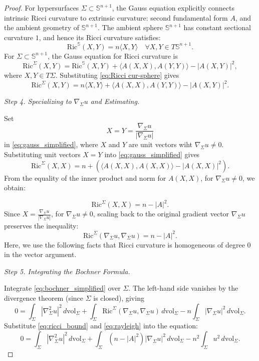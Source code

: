 \documentclass[10pt,a4paper]{amsart}
\begin{document}
\begin{proof}
For hypersurfaces \(\Sigma \subset \mathbb{S}^{n+1}\), the Gauss equation explicitly connects intrinsic Ricci curvature to extrinsic curvature: second fundamental form \(A\), and the ambient geometry of \(\mathbb{S}^{n+1}\). The ambient sphere \(\mathbb{S}^{n+1}\) has constant sectional curvature \(1\), and hence its Ricci curvature satisfies:
\begin{equation}\label{eq:Ricci cur-sphere}
\text{Ric}^{\mathbb{S}}(X,Y) = n \langle X,Y \rangle \quad \forall X,Y \in T\mathbb{S}^{n+1}.
\end{equation}
For \(\Sigma \subset \mathbb{S}^{n+1}\), the Gauss equation for Ricci curvature is
\begin{equation}\label{eq:gauss}
\text{Ric}^\Sigma(X,Y) = \text{Ric}^{\mathbb{S}}(X,Y) + \langle A(X,X), A(Y,Y) \rangle - |A(X,Y)|^2,
\end{equation}
where \(X,Y \in T\Sigma\). Substituting \eqref{eq:Ricci cur-sphere} gives
\begin{equation}\label{eq:gauss_simplified}
\text{Ric}^\Sigma(X,Y) = n \langle X,Y \rangle + \langle A(X,X), A(Y,Y) \rangle - |A(X,Y)|^2.
\end{equation}


\textit{Step 4. Specializing to \(\nabla_\Sigma u\) and Estimating.}

Set \[X = Y = \frac{\nabla_\Sigma u}{|\nabla_\Sigma u|}\] in \eqref{eq:gauss_simplified}, where \(X\) and \(Y\) are unit vectors wiht \(\nabla_\Sigma u \neq 0\).
Substituting unit vectors \(X = Y\) into \eqref{eq:gauss_simplified} gives
\[
\text{Ric}^\Sigma(X, X) = n   + \left( \langle A(X, X), A(X, X) \rangle - |A(X, X)|^2 \right).
\]
From the equality of the inner product and norm for \(A(X,X)\), for \(\nabla_\Sigma u \neq 0\), we obtain:

\[
\text{Ric}^\Sigma(X, X) = n - |A|^2.
\]
Since \(X = \frac{\nabla_\Sigma u}{|\nabla_\Sigma u|}\), for \(\nabla_\Sigma u \neq 0\), scaling back to the original gradient vector \(\nabla_\Sigma u\) preserves the inequality:
\begin{equation}\label{eq:ricci_bound}
\text{Ric}^\Sigma(\nabla_\Sigma u, \nabla_\Sigma u) = n - |A|^2.
\end{equation}Here, we use the following facts that Ricci curvature is homogeneous of degree 0 in the vector argument.

\textit{Step 5. Integrating the Bochner Formula.}

Integrate \eqref{eq:bochner_simplified} over \(\Sigma\). The left-hand side vanishes by the divergence theorem (since \(\Sigma\) is closed), giving
\[
0 = \int_\Sigma |\nabla^2_\Sigma u|^2 \, d\mathrm{vol}_\Sigma + \int_\Sigma \text{Ric}^\Sigma(\nabla_\Sigma u, \nabla_\Sigma u) \, d\mathrm{vol}_\Sigma - n \int_\Sigma |\nabla_\Sigma u|^2 \, d\mathrm{vol}_\Sigma.
\] Substitute \eqref{eq:ricci_bound} and \eqref{eq:rayleigh} into the equation:
\[
0 = \int_\Sigma |\nabla^2_\Sigma u|^2 \, d\mathrm{vol}_\Sigma + \int_\Sigma (n - |A|^2) |\nabla_\Sigma u|^2 \, d\mathrm{vol}_\Sigma - n^2 \int_\Sigma u^2 \, d\mathrm{vol}_\Sigma.
\]


\end{proof}
\end{document}
